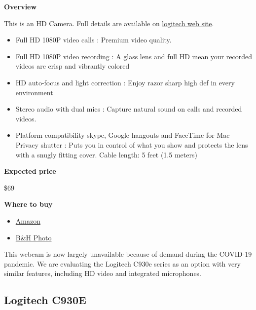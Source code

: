 \begin{gram}
\textbf{Overview}

This is an HD Camera.  Full details are available on 
%
\href{https://www.logitech.com/en-us/product/hd-pro-webcam-c920s}{logitech web site}.
%
\begin{itemize}
\item
Full HD 1080P video calls : Premium video quality.
\item
Full HD 1080P video recording : A glass lens and full HD mean your recorded videos are crisp and vibrantly colored
\item
HD auto-focus and light correction : Enjoy razor sharp high def in every environment

\item
Stereo audio with dual mics : Capture natural sound on calls and recorded videos. 

\item 
Platform compatibility skype, Google hangouts and FaceTime for Mac
Privacy shutter : Puts you in control of what you show and protects the lens with a snugly fitting cover. Cable length: 5 feet (1.5 meters)
\end{itemize}


\textbf{Expected price}

\$69

\textbf{Where to buy}

\begin{itemize}
\item
\href{https://www.amazon.com/Logitech-Widescreen-Calling-Recording-Desktop/dp/B006JH8T3S/ref=sr_1_2?crid=2T6CQ3HNRR1XR&keywords=logitech+c920&qid=1582900645&s=electronics&sprefix=logitech+c,electronics,172&sr=1-2}{Amazon}
\item
\href{https://www.bhphotovideo.com/c/product/1461727-REG/logitech_960_001257_c920s_hd_pro_webcam.html}{B\&H Photo}
\end{itemize}

This webcam is now largely unavailable because of demand during the
COVID-19 pandemic. We are evaluating the Logitech C930e series as an
option with very similar features, including HD video and integrated
microphones.
\end{gram}

\subsection{Logitech C930E}

